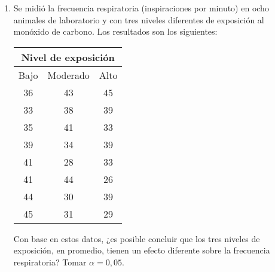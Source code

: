 \begin{enumerate}[leftmargin=*]
\item Se midió la frecuencia respiratoria (inspiraciones por
minuto) en ocho animales de laboratorio y con tres niveles
diferentes de exposición al monóxido de carbono. Los resultados
son los siguientes:
\begin{center}
\begin{tabular}{lll}
\multicolumn{3}{c}{Nivel de exposición} \\
\hline
\multicolumn{1}{c}{Bajo} & \multicolumn{1}{c}{Moderado} & \multicolumn{1}{c}{Alto} \\
\hline
\multicolumn{1}{c}{36} & \multicolumn{1}{c}{43} & \multicolumn{1}{c}{45} \\
\multicolumn{1}{c}{33} & \multicolumn{1}{c}{38} & \multicolumn{1}{c}{39} \\
\multicolumn{1}{c}{35} & \multicolumn{1}{c}{41} & \multicolumn{1}{c}{33} \\
\multicolumn{1}{c}{39} & \multicolumn{1}{c}{34} & \multicolumn{1}{c}{39} \\
\multicolumn{1}{c}{41} & \multicolumn{1}{c}{28} & \multicolumn{1}{c}{33} \\
\multicolumn{1}{c}{41} & \multicolumn{1}{c}{44} & \multicolumn{1}{c}{26} \\
\multicolumn{1}{c}{44} & \multicolumn{1}{c}{30} & \multicolumn{1}{c}{39} \\
\multicolumn{1}{c}{45} & \multicolumn{1}{c}{31} & \multicolumn{1}{c}{29} \\
\hline
\end{tabular}
\end{center}

Con base en estos datos, ¿es posible concluir que los tres niveles
de exposición, en promedio, tienen un efecto diferente sobre la
frecuencia respiratoria? Tomar $\alpha=0,05$.
\end{enumerate}

